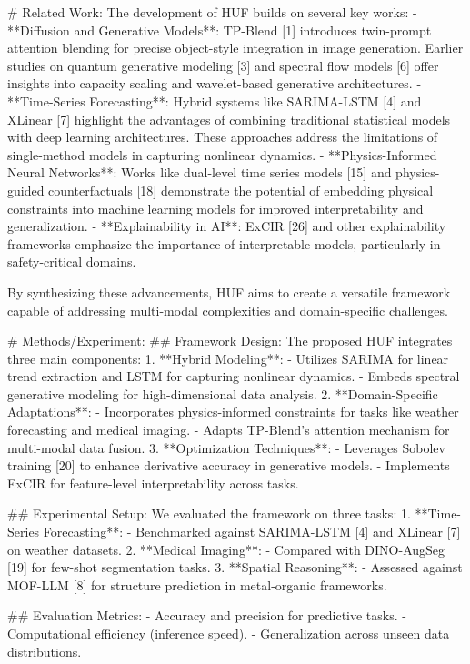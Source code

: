 # Related Work:
The development of HUF builds on several key works:
- **Diffusion and Generative Models**: TP-Blend [1] introduces twin-prompt attention blending for precise object-style integration in image generation. Earlier studies on quantum generative modeling [3] and spectral flow models [6] offer insights into capacity scaling and wavelet-based generative architectures.
- **Time-Series Forecasting**: Hybrid systems like SARIMA-LSTM [4] and XLinear [7] highlight the advantages of combining traditional statistical models with deep learning architectures. These approaches address the limitations of single-method models in capturing nonlinear dynamics.
- **Physics-Informed Neural Networks**: Works like dual-level time series models [15] and physics-guided counterfactuals [18] demonstrate the potential of embedding physical constraints into machine learning models for improved interpretability and generalization.
- **Explainability in AI**: ExCIR [26] and other explainability frameworks emphasize the importance of interpretable models, particularly in safety-critical domains.

By synthesizing these advancements, HUF aims to create a versatile framework capable of addressing multi-modal complexities and domain-specific challenges.

# Methods/Experiment:
## Framework Design:
The proposed HUF integrates three main components:
1. **Hybrid Modeling**:
   - Utilizes SARIMA for linear trend extraction and LSTM for capturing nonlinear dynamics.
   - Embeds spectral generative modeling for high-dimensional data analysis.
2. **Domain-Specific Adaptations**:
   - Incorporates physics-informed constraints for tasks like weather forecasting and medical imaging.
   - Adapts TP-Blend's attention mechanism for multi-modal data fusion.
3. **Optimization Techniques**:
   - Leverages Sobolev training [20] to enhance derivative accuracy in generative models.
   - Implements ExCIR for feature-level interpretability across tasks.

## Experimental Setup:
We evaluated the framework on three tasks:
1. **Time-Series Forecasting**:
   - Benchmarked against SARIMA-LSTM [4] and XLinear [7] on weather datasets.
2. **Medical Imaging**:
   - Compared with DINO-AugSeg [19] for few-shot segmentation tasks.
3. **Spatial Reasoning**:
   - Assessed against MOF-LLM [8] for structure prediction in metal-organic frameworks.

## Evaluation Metrics:
- Accuracy and precision for predictive tasks.
- Computational efficiency (inference speed).
- Generalization across unseen data distributions.

